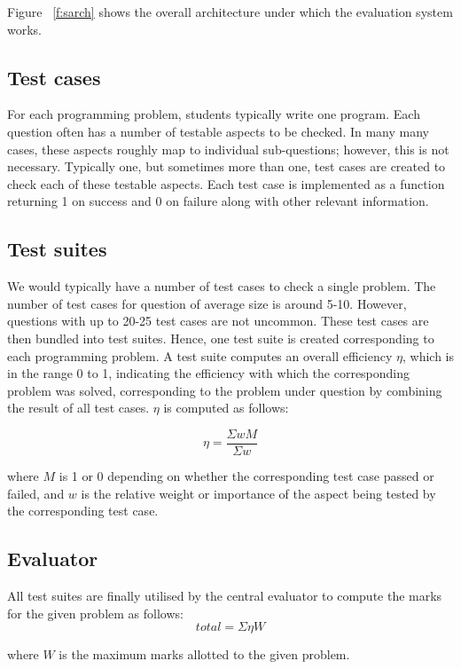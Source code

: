 \documentclass[sigconf]{acmart}
\begin{document}
Figure ~\ref{f:sarch} shows the overall architecture under which the evaluation system works.

\subsection{Test cases}
For each programming problem, students typically write one program. Each question often has a number of testable aspects to be checked. In many many cases, these aspects roughly map to individual sub-questions; however, this is not necessary. Typically one, but sometimes more than one, test cases are created to check each of these testable aspects. Each test case is implemented as a function returning 1 on success and 0 on failure along with other relevant information.

\subsection{Test suites}
We would typically have a number of test cases to check a single problem. The number of test cases for question of average size is around 5-10. However, questions with up to 20-25 test cases are not uncommon. These test cases are then bundled into test suites. Hence, one test suite is created corresponding to each programming problem. A test suite computes an overall efficiency $\eta$, which is in the range 0 to 1, indicating the efficiency with which the corresponding problem was solved, corresponding to the problem under question by combining the result of all test cases. $\eta$ is computed as follows:

\begin{equation}
\eta = \frac{\Sigma wM}{\Sigma w}
\end{equation}

where $M$ is 1 or 0 depending on whether the corresponding test case passed or failed, and $w$ is the relative weight or importance of the aspect being tested by the corresponding test case.

\subsection{Evaluator}
All test suites are finally utilised by the central evaluator to compute the marks for the given problem as follows:
\begin{equation}
total = \Sigma \eta W
\end{equation}

where $W$ is the maximum marks allotted to the given problem.
\end{document}

